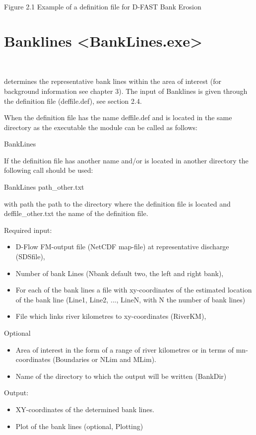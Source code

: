 Figure 2.1	Example of a definition file for D-FAST Bank Erosion

\section{Banklines <BankLines.exe>}\

determines the representative bank lines within the area of interest (for background information see chapter 3).
The input of Banklines is given through the definition file (deffile.def), see section 2.4.

When the definition file has the name deffile.def and is located in the same directory as the executable the module can be called as follows:

BankLines

If the definition file has another name and/or is located in another directory the following call should be used:

BankLines path_other.txt

with path the path to the directory where the definition file is located and deffile_other.txt the name of the definition file.

Required input:

\begin{itemize}
\item D-Flow FM-output file (NetCDF map-file) at representative discharge (SDSfile),
\item Number of bank Lines (Nbank default two, the left and right bank),
\item For each of the bank lines a file with xy-coordinates of the estimated location of the bank  line (Line1, Line2, ..., LineN, with N the number of bank lines)
\item File which links river kilometres to xy-coordinates (RiverKM),
\end{itemize}


Optional

\begin{itemize}
\item Area of interest in the form of a range of river kilometres or in terms of mn-coordinates (Boundaries or NLim and MLim).
\item Name of the directory to which the output will be written (BankDir)
\end{itemize}

Output:

\begin{itemize}
\item XY-coordinates of the determined bank lines.
\item Plot of the bank lines (optional, Plotting)
\end{itemize}

